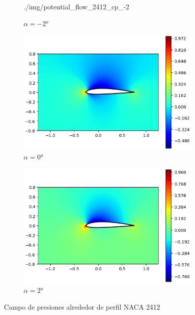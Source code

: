 \documentclass[letterpaper, openright, 12pt]{book}
\begin{document}
\begin{figure}[htbp!]
\begin{subfigure}[c]{0.48\textwidth}
                {./img/potential_flow_2412_cp_-2}
            \caption{$\alpha = -2\si{\degree}$}
            \label{fig:potential_flow_2412_cp_-2}
        \end{subfigure}
        \begin{subfigure}[c]{0.48\textwidth}
            \includegraphics[keepaspectratio, width=0.99\textwidth]
                {./img/potential_flow_2412_cp_0}
            \caption{$\alpha = 0\si{\degree}$}
            \label{fig:potential_flow_2412_cp_0}
        \end{subfigure}
        \hfill
        \begin{subfigure}[c]{0.48\textwidth}
            \includegraphics[keepaspectratio, width=0.99\textwidth]
                {./img/potential_flow_2412_cp_2}
            \caption{$\alpha = 2\si{\degree}$}
            \label{fig:potential_flow_2412_cp_2}
        \end{subfigure}
        \caption{Campo de presiones alrededor de perfil NACA 2412}
        \label{fig:potential_flow_2412_cp__0}
    \end{figure}
\end{document}
